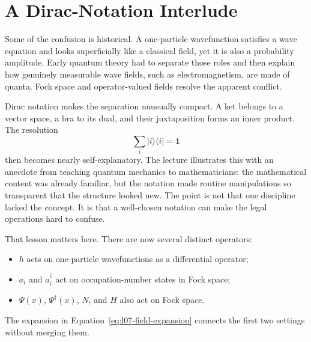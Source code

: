 \section{A Dirac-Notation Interlude}

Some of the confusion is historical. A one-particle wavefunction satisfies a wave equation and looks superficially like a classical field, yet it is also a probability amplitude. Early quantum theory had to separate those roles and then explain how genuinely measurable wave fields, such as electromagnetism, are made of quanta. Fock space and operator-valued fields resolve the apparent conflict.

Dirac notation makes the separation unusually compact. A ket belongs to a vector space, a bra to its dual, and their juxtaposition forms an inner product. The resolution
\begin{equation}
\sum_i|i\rangle\langle i|=\mathbf 1
\end{equation}
then becomes nearly self-explanatory. The lecture illustrates this with an anecdote from teaching quantum mechanics to mathematicians: the mathematical content was already familiar, but the notation made routine manipulations so transparent that the structure looked new. The point is not that one discipline lacked the concept. It is that a well-chosen notation can make the legal operations hard to confuse.

That lesson matters here. There are now several distinct operators:
\begin{itemize}
\item \(h\) acts on one-particle wavefunctions as a differential operator;
\item \(a_i\) and \(a_i^\dagger\) act on occupation-number states in Fock space;
\item \(\Psi(x)\), \(\Psi^\dagger(x)\), \(N\), and \(H\) also act on Fock space.
\end{itemize}
The expansion in Equation~\eqref{eq:l07-field-expansion} connects the first two settings without merging them.

\begin{classroomqa}
\end{classroomqa}

